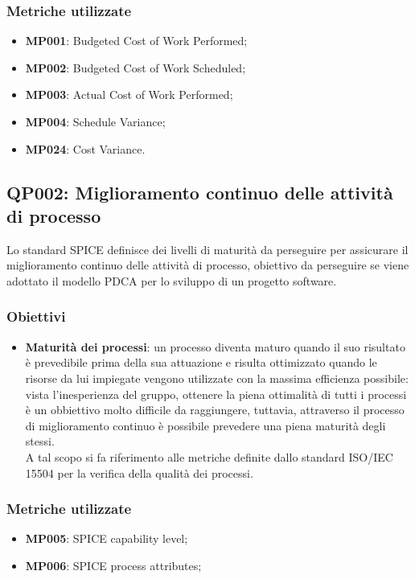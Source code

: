 \subsubsection{Metriche utilizzate}
\begin{itemize}
	\item \textbf{MP001}: Budgeted Cost of Work Performed;
	\item \textbf{MP002}: Budgeted Cost of Work Scheduled;
	\item \textbf{MP003}: Actual Cost of Work Performed;
	\item \textbf{MP004}: Schedule Variance;
	\item \textbf{MP024}: Cost Variance.
\end{itemize}


\subsection{QP002: Miglioramento continuo delle attività di processo}
Lo standard SPICE definisce dei livelli di maturità da perseguire per assicurare il miglioramento continuo delle attività di processo, obiettivo da perseguire se viene adottato il modello PDCA per lo sviluppo di un progetto software.
\subsubsection{Obiettivi}
\begin{itemize}
	\item \textbf{Maturità dei processi}: un processo diventa maturo quando il suo risultato è prevedibile prima della sua attuazione e risulta ottimizzato quando le risorse da lui impiegate vengono utilizzate con la massima efficienza possibile: vista l'inesperienza del gruppo, ottenere la piena ottimalità di tutti i processi è un obbiettivo molto difficile da raggiungere, tuttavia, attraverso il processo di miglioramento continuo è possibile prevedere una piena maturità degli stessi.\\
	A tal scopo si fa riferimento alle metriche definite dallo standard ISO/IEC 15504 per la verifica della qualità dei processi.
\end{itemize}

\subsubsection{Metriche utilizzate}
\begin{itemize}
	\item \textbf{MP005}: SPICE capability level;
	\item \textbf{MP006}: SPICE process attributes;
\end{itemize}

